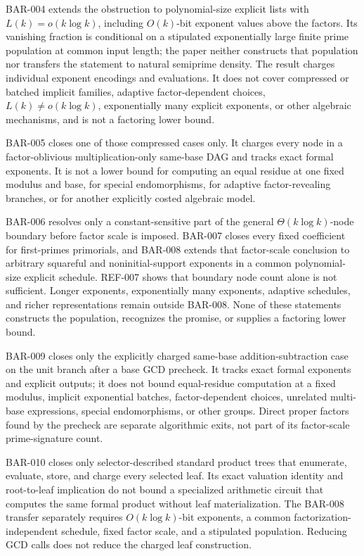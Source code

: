 \documentclass[11pt]{article}
\begin{document}
BAR-004 extends the obstruction to polynomial-size explicit lists with
\(L(k)=o(k\log k)\), including \(O(k)\)-bit exponent values above the factors.
Its vanishing fraction is conditional on a stipulated exponentially large
finite prime population at common input length; the paper neither constructs
that population nor transfers the statement to natural semiprime density.
The result charges individual exponent encodings and evaluations. It does not
cover compressed or batched implicit families, adaptive factor-dependent
choices, \(L(k)\not=o(k\log k)\), exponentially many explicit exponents, or
other algebraic mechanisms, and is not a factoring lower bound.

BAR-005 closes one of those compressed cases only. It charges every node in a
factor-oblivious multiplication-only same-base DAG and tracks exact formal
exponents. It is not a lower bound for computing an equal residue at one fixed
modulus and base, for special endomorphisms, for adaptive factor-revealing
branches, or for another explicitly costed algebraic model.

BAR-006 resolves only a constant-sensitive part of the general
\(\Theta(k\log k)\)-node boundary before factor scale is imposed. BAR-007
closes every fixed coefficient for first-primes primorials, and BAR-008
extends that factor-scale conclusion to arbitrary squareful and
noninitial-support exponents in a common polynomial-size explicit schedule.
REF-007 shows that boundary node count alone is not sufficient. Longer
exponents, exponentially many exponents, adaptive schedules, and richer
representations remain outside BAR-008. None of these statements constructs
the population, recognizes the promise, or supplies a factoring lower bound.

BAR-009 closes only the explicitly charged same-base addition-subtraction
case on the unit branch after a base GCD precheck. It tracks exact formal
exponents and explicit outputs; it does not bound equal-residue computation
at a fixed modulus, implicit exponential batches, factor-dependent choices,
unrelated multi-base expressions, special endomorphisms, or other groups.
Direct proper factors found by the precheck are separate algorithmic exits,
not part of its factor-scale prime-signature count.

BAR-010 closes only selector-described standard product trees that enumerate,
evaluate, store, and charge every selected leaf. Its exact valuation identity
and root-to-leaf implication do not bound a specialized arithmetic circuit
that computes the same formal product without leaf materialization. The
BAR-008 transfer separately requires \(O(k\log k)\)-bit exponents, a common
factorization-independent schedule, fixed factor scale, and a stipulated
population. Reducing GCD calls does not reduce the charged leaf construction.
\end{document}
